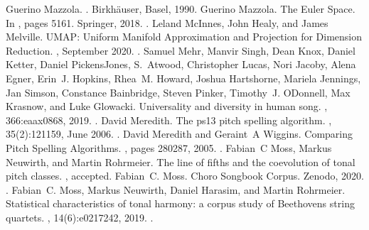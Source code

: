 \documentclass[letterpaper,10pt,english]{sphinxmanual}
\begin{document}
\begin{sphinxthebibliography}{10}
\sphinxAtStartPar
Guerino Mazzola. . Birkhäuser, Basel, 1990.
\sphinxAtStartPar
Guerino Mazzola. The Euler Space. In , pages 51\textendash{}61. Springer, 2018. .
\sphinxAtStartPar
Leland McInnes, John Healy, and James Melville. UMAP: Uniform Manifold Approximation and Projection for Dimension Reduction. , September 2020. .
\sphinxAtStartPar
Samuel Mehr, Manvir Singh, Dean Knox, Daniel Ketter, Daniel Pickens\sphinxhyphen{}Jones, S. Atwood, Christopher Lucas, Nori Jacoby, Alena Egner, Erin J. Hopkins, Rhea M. Howard, Joshua Hartshorne, Mariela Jennings, Jan Simson, Constance Bainbridge, Steven Pinker, Timothy J. O\textquotesingle{}Donnell, Max Krasnow, and Luke Glowacki. Universality and diversity in human song. , 366:eaax0868, 2019. .
\sphinxAtStartPar
David Meredith. The ps13 pitch spelling algorithm. , 35(2):121\textendash{}159, June 2006. .
\sphinxAtStartPar
David Meredith and Geraint A Wiggins. Comparing Pitch Spelling Algorithms. , pages 280\textendash{}287, 2005. .
\sphinxAtStartPar
Fabian C Moss, Markus Neuwirth, and Martin Rohrmeier. The line of fifths and the co\sphinxhyphen{}evolution of tonal pitch classes. , accepted.
\sphinxAtStartPar
Fabian C. Moss. Choro Songbook Corpus. Zenodo, 2020. .
\sphinxAtStartPar
Fabian C. Moss, Markus Neuwirth, Daniel Harasim, and Martin Rohrmeier. Statistical characteristics of tonal harmony: a corpus study of Beethoven\textquotesingle{}s string quartets. , 14(6):e0217242, 2019. .

\end{sphinxthebibliography}
\end{document}
